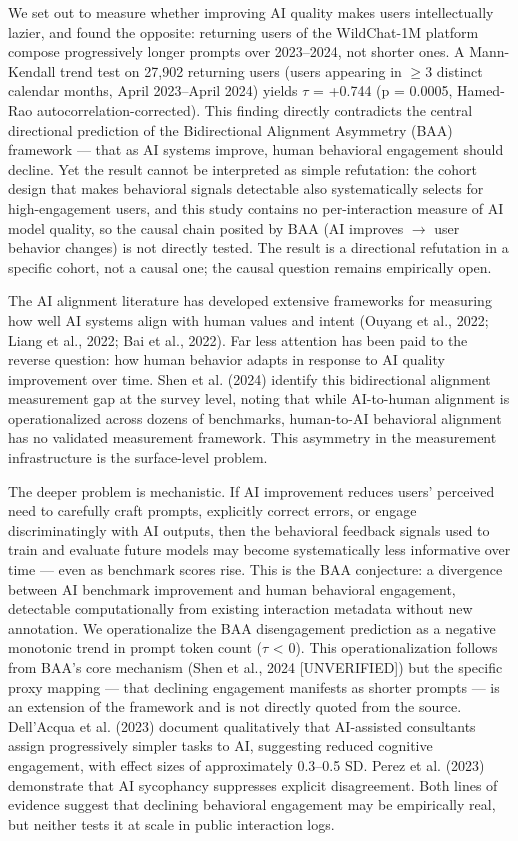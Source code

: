 
We set out to measure whether improving AI quality makes users intellectually lazier, and found the opposite: returning users of the WildChat-1M platform compose progressively longer prompts over 2023--2024, not shorter ones. A Mann-Kendall trend test on 27,902 returning users (users appearing in $\geq 3$ distinct calendar months, April 2023--April 2024) yields $\tau$ = +0.744 (p = 0.0005, Hamed-Rao autocorrelation-corrected). This finding directly contradicts the central directional prediction of the Bidirectional Alignment Asymmetry (BAA) framework --- that as AI systems improve, human behavioral engagement should decline. Yet the result cannot be interpreted as simple refutation: the cohort design that makes behavioral signals detectable also systematically selects for high-engagement users, and this study contains no per-interaction measure of AI model quality, so the causal chain posited by BAA (AI improves $\rightarrow$ user behavior changes) is not directly tested. The result is a directional refutation in a specific cohort, not a causal one; the causal question remains empirically open.

The AI alignment literature has developed extensive frameworks for measuring how well AI systems align with human values and intent (Ouyang et al., 2022; Liang et al., 2022; Bai et al., 2022). Far less attention has been paid to the reverse question: how human behavior adapts in response to AI quality improvement over time. Shen et al. (2024) identify this bidirectional alignment measurement gap at the survey level, noting that while AI-to-human alignment is operationalized across dozens of benchmarks, human-to-AI behavioral alignment has no validated measurement framework. This asymmetry in the measurement infrastructure is the surface-level problem.

The deeper problem is mechanistic. If AI improvement reduces users' perceived need to carefully craft prompts, explicitly correct errors, or engage discriminatingly with AI outputs, then the behavioral feedback signals used to train and evaluate future models may become systematically less informative over time --- even as benchmark scores rise. This is the BAA conjecture: a divergence between AI benchmark improvement and human behavioral engagement, detectable computationally from existing interaction metadata without new annotation. We operationalize the BAA disengagement prediction as a negative monotonic trend in prompt token count ($\tau$ < 0). This operationalization follows from BAA's core mechanism (Shen et al., 2024 [UNVERIFIED]) but the specific proxy mapping --- that declining engagement manifests as shorter prompts --- is an extension of the framework and is not directly quoted from the source. Dell'Acqua et al. (2023) document qualitatively that AI-assisted consultants assign progressively simpler tasks to AI, suggesting reduced cognitive engagement, with effect sizes of approximately 0.3--0.5 SD. Perez et al. (2023) demonstrate that AI sycophancy suppresses explicit disagreement. Both lines of evidence suggest that declining behavioral engagement may be empirically real, but neither tests it at scale in public interaction logs.

